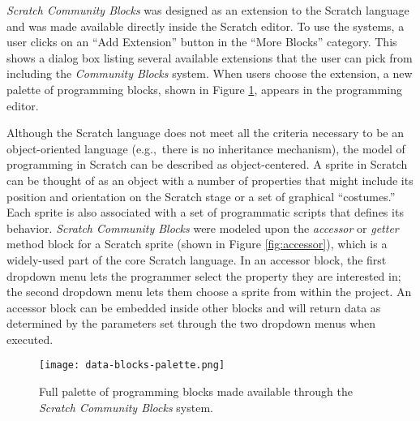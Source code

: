 \documentclass{sigchi}
\begin{document}
\emph{Scratch Community Blocks} was designed as an extension to the Scratch language and was made available directly inside the Scratch editor. To use the systems, a user clicks on an ``Add Extension'' button in the ``More Blocks'' category. This shows a dialog box listing several available extensions that the user can pick from including the \emph{Community Blocks} system. When users choose the extension, a new palette of programming blocks, shown in Figure \ref{fig:palette}, appears in the programming editor.

Although the Scratch language does not meet all the criteria necessary to be an object-oriented language (e.g.,~there is no inheritance mechanism), the model of programming in Scratch can be described as object-centered. A sprite in Scratch can be thought of as an object with a number of properties that might include its position and orientation on the Scratch stage or a set of graphical ``costumes.'' Each sprite is also associated with a set of programmatic scripts that defines its behavior. \emph{Scratch Community Blocks} were modeled upon the \emph{accessor} or \emph{getter} method block for a Scratch sprite (shown in Figure \ref{fig:accessor}), which is a widely-used part of the core Scratch language. In an accessor block, the first dropdown menu lets the programmer select the property they are interested in; the second dropdown menu lets them choose a sprite from within the project. An accessor block can be embedded inside other blocks and will return data as determined by the parameters set through the two dropdown menus when executed.

\begin{figure}[h!]
\texttt{[image: data-blocks-palette.png]}
\centering
\caption{Full palette of programming blocks made available through the \emph{Scratch Community Blocks} system.}
\label{fig:palette}
\end{figure}
\end{document}
